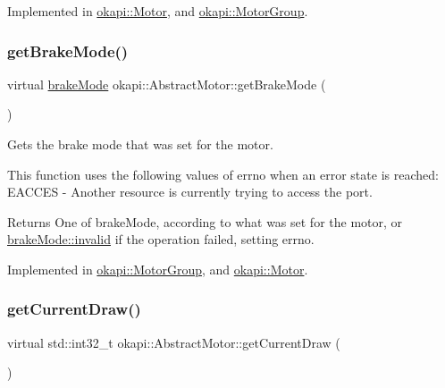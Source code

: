 Implemented in \mbox{\hyperlink{classokapi_1_1Motor_a12dab94ff8e0636c01d3c568d9461655}{okapi\+::\+Motor}}, and \mbox{\hyperlink{classokapi_1_1MotorGroup_a5cbb95146d4663440632a9e3ccc99ae9}{okapi\+::\+Motor\+Group}}.

\mbox{\label{classokapi_1_1AbstractMotor_a157407c39c952a7c2eb497bddb868c93}} 
\subsubsection{\texorpdfstring{getBrakeMode()}{getBrakeMode()}}
{\footnotesize\ttfamily virtual \mbox{\hyperlink{classokapi_1_1AbstractMotor_a132e0485dbb59a60c3f934338d8fa601}{brake\+Mode}} okapi\+::\+Abstract\+Motor\+::get\+Brake\+Mode (\begin{DoxyParamCaption}{ }\end{DoxyParamCaption})\hspace{0.3cm}{\ttfamily [pure virtual]}}

Gets the brake mode that was set for the motor.

This function uses the following values of errno when an error state is reached\+: E\+A\+C\+C\+ES -\/ Another resource is currently trying to access the port.

\begin{DoxyReturn}{Returns}
One of brake\+Mode, according to what was set for the motor, or \mbox{\hyperlink{classokapi_1_1AbstractMotor_a132e0485dbb59a60c3f934338d8fa601afedb2d84cafe20862cb4399751a8a7e3}{brake\+Mode\+::invalid}} if the operation failed, setting errno. 
\end{DoxyReturn}


Implemented in \mbox{\hyperlink{classokapi_1_1MotorGroup_a96fb47ca2da80930123c2b7e7176befb}{okapi\+::\+Motor\+Group}}, and \mbox{\hyperlink{classokapi_1_1Motor_aec419fead574828b4b1b2642a424dcbe}{okapi\+::\+Motor}}.

\mbox{\label{classokapi_1_1AbstractMotor_a755ad2c78a4b36cc56eef1029a3aa217}} 
\subsubsection{\texorpdfstring{getCurrentDraw()}{getCurrentDraw()}}
{\footnotesize\ttfamily virtual std\+::int32\+\_\+t okapi\+::\+Abstract\+Motor\+::get\+Current\+Draw (\begin{DoxyParamCaption}{ }\end{DoxyParamCaption})\hspace{0.3cm}{\ttfamily [pure virtual]}}

